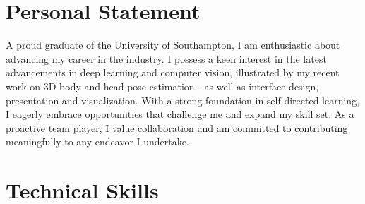 \documentclass[letterpaper]{twentysecondcv} %
\begin{document}





\makeprofile %



\section*{Personal Statement}


A proud graduate of the University of Southampton, I am enthusiastic about advancing my career in the industry. I possess a keen interest in the latest advancements in deep learning and computer vision, illustrated by my recent work on 3D body and head pose estimation - as well as interface design, presentation and visualization. With a strong foundation in self-directed learning, I eagerly embrace opportunities that challenge me and expand my skill set. As a proactive team player, I value collaboration and am committed to contributing meaningfully to any endeavor I undertake.





\section*{Technical Skills}

\cvtags
\end{document}
